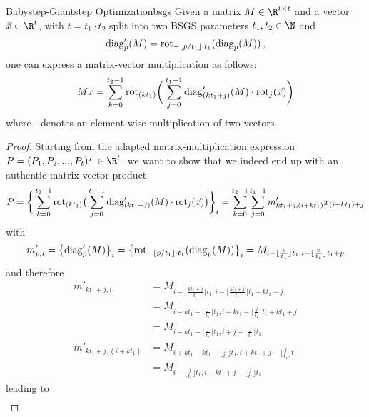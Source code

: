 \begin{theorem}{Babystep-Giantstep Optimization}{bsgs}
  Given a matrix $M \in \R^{t \times t}$ and a vector $\vec{x} \in \R^t$, with $t = t_1 \cdot t_2$ split into two BSGS parameters $t_1, t_2 \in \N$ and
  $$\mathrm{diag}'_p(M) = \mathrm{rot}_{-\lfloor p/t_1 \rfloor \cdot t_1}(\mathrm{diag}_p(M))\,,$$
  one can express a matrix-vector multiplication as follows:
  \begin{equation}
    M \vec{x} = \sum_{k=0}^{t_2-1} \mathrm{rot}_{(kt_1)} \bigg(
    \sum_{j=0}^{t_1-1} \mathrm{diag}'_{(kt_1+j)}(M) \cdot \mathrm{rot}_j(\vec{x})
    \bigg)
  \end{equation}
  where $\cdot$ denotes an element-wise multiplication of two vectors.
\end{theorem}

\begin{proof}
  Starting from the adapted matrix-multiplication expression $P = (P_1, P_2, ..., P_t)^T \in \R^t$, we want to show that we indeed end up with an authentic matrix-vector product.
  \begin{align*}
    P = \bigg\{\sum_{k=0}^{t_2-1} \mathrm{rot}_{(kt_1)} \big(
    \sum_{j=0}^{t_1-1} \mathrm{diag}'_{(kt_1+j)}(M) \cdot \mathrm{rot}_j(\vec{x})
    \big)\bigg\}_i = \sum_{k=0}^{t_2-1} \sum_{j=0}^{t_1-1} m'_{kt_1+j,(i+kt_1)} x_{(i+kt_1)+j}
  \end{align*}
  with
  \begin{align*}
    m'_{p,i} = \big\{ \mathrm{diag}'_p(M)\big \}_i = \big\{ \mathrm{rot}_{-\lfloor p/t_1 \rfloor \cdot t_1}(\mathrm{diag}_p(M)) \big\}_i
    = M_{i-\lfloor\frac{p}{t_1}\rfloor t_1, i-\lfloor\frac{p}{t_1}\rfloor t_1 + p}
  \end{align*}
  and therefore
  \begin{align*}
    m'_{kt_1+j,i}        & = M_{i-\lfloor\frac{kt_1+j}{t_1}\rfloor t_1, i-\lfloor\frac{kt_1+j}{t_1}\rfloor t_1 + kt_1+j} \\
                         & = M_{i-kt_1-\lfloor\frac{j}{t_1}\rfloor t_1, i-kt_1-\lfloor\frac{j}{t_1}\rfloor t_1 + kt_1+j} \\
                         & = M_{i-kt_1-\lfloor\frac{j}{t_1}\rfloor t_1, i+j-\lfloor\frac{j}{t_1}\rfloor t_1}             \\
    m'_{kt_1+j,(i+kt_1)} & = M_{i+kt_1-kt_1-\lfloor\frac{j}{t_1}\rfloor t_1, i+kt_1+j-\lfloor\frac{j}{t_1}\rfloor t_1}   \\
                         & = M_{i-\lfloor\frac{j}{t_1}\rfloor t_1, i+kt_1+j-\lfloor\frac{j}{t_1}\rfloor t_1}
  \end{align*}
  leading to
  \begin{align*}

\end{align*}
\end{proof}
